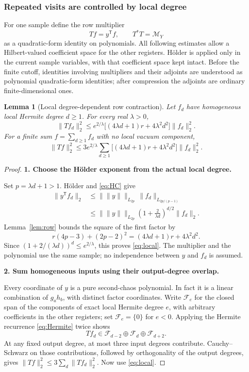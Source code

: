 \documentclass[11pt]{article}
\numberwithin{equation}{section}
\newtheorem{lemma}[theorem]{Lemma}
\theoremstyle{definition}\newtheorem{definition}[theorem]{Definition}
\theoremstyle{remark}\newtheorem{remark}[theorem]{Remark}
\newcommand{\norm}[1]{\lVert#1\rVert}\newcommand{\ip}[2]{\langle#1,#2\rangle}
\newcommand{\step}[1]{\par\addvspace{.65\baselineskip}\Needspace{4\baselineskip}\noindent\textbf{#1}\par\nobreak\smallskip}
\begin{document}
\subsubsection{Repeated visits are controlled by local degree}
For one sample define the row multiplier
\[
 Tf=y^{\mathsf T}f,\qquad T^*T=\mathcal M_Y
\]
as a quadratic-form identity on polynomials. All following estimates allow a
Hilbert-valued coefficient space for the other registers. H\"older is applied
only in the current sample variables, with that coefficient space kept intact.
Before the finite cutoff, identities involving multipliers and their adjoints
are understood as polynomial quadratic-form identities; after compression the
adjoints are ordinary finite-dimensional ones.

\begin{lemma}[Local degree-dependent row contraction]\label{lem:local}
Let $f_d$ have homogeneous local Hermite degree $d\ge1$. For every real
$\lambda>0$,
\begin{equation}\label{eq:local}
 \norm{Tf_d}_2^2\le
 e^{2/\lambda}\bigl[(4\lambda d+1)r+4\lambda^2d^2\bigr]\norm{f_d}_2^2.
\end{equation}
For a finite sum $f=\sum_{d\ge1}f_d$ with no local vacuum component,
\begin{equation}\label{eq:local-sum}
 \norm{Tf}_2^2\le3e^{2/\lambda}\sum_{d\ge1}
 \bigl[(4\lambda d+1)r+4\lambda^2d^2\bigr]\norm{f_d}_2^2.
\end{equation}
\end{lemma}
\begin{proof}
\step{1. Choose the H\"older exponent from the actual local degree.}
Set $p=\lambda d+1>1$. H\"older and \eqref{eq:HC} give
\begin{align*}
 \norm{y^{\mathsf T}f_d}_2
 &\le\bigl\|\norm y\bigr\|_{L_{2p}}\,\norm{f_d}_{L_{2p/(p-1)}}\\
 &\le\bigl\|\norm y\bigr\|_{L_{2p}}
 \left(1+\frac2{\lambda d}\right)^{d/2}\norm{f_d}_2.
\end{align*}
Lemma~\ref{lem:row} bounds the square of the first factor by
\[
 r(4p-3)+(2p-2)^2=(4\lambda d+1)r+4\lambda^2d^2.
\]
Since $(1+2/(\lambda d))^d\le e^{2/\lambda}$, this proves
\eqref{eq:local}. The multiplier and the polynomial use the same sample;
no independence between $y$ and $f_d$ is assumed.

\step{2. Sum homogeneous inputs using their output-degree overlap.}
Every coordinate of $y$ is a pure second-chaos polynomial. In fact it is a linear
combination of $g_a h_b$, with distinct factor coordinates. Write $\mathcal F_e$
for the closed span of the components of exact local Hermite degree $e$, with
arbitrary coefficients in the other registers; set $\mathcal F_e=\{0\}$ for
$e<0$. Applying the Hermite recurrence \eqref{eq:Hermite} twice shows
\[
 Tf_d\in\mathcal F_{d-2}\oplus\mathcal F_d\oplus\mathcal F_{d+2}.
\]
At any fixed output degree, at most three input degrees contribute.
Cauchy--Schwarz on those contributions, followed by orthogonality of the output
degrees, gives $\norm{Tf}_2^2\le3\sum_d\norm{Tf_d}_2^2$.
Now use \eqref{eq:local}.
\end{proof}
\end{document}
